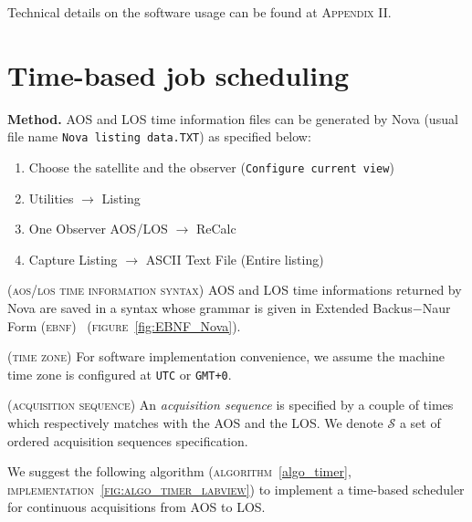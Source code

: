 \documentclass[a4paper]{report}
\newenvironment{definition}[1][Definition.]{\begin{trivlist}
\item[\hskip \labelsep {\bfseries #1}]}{\end{trivlist}}
\newenvironment{remark}[1][Remark.]{\begin{trivlist}
\item[\hskip \labelsep {\bfseries #1}]}{\end{trivlist}}
\begin{document}
\begin{remark}
  Technical details on the software usage can be found at \textsc{Appendix II}.
\end{remark}

\section {Time-based job scheduling}

\textbf{Method.}
AOS and LOS time information files can be generated by Nova (usual file name \texttt{Nova listing data.TXT}) as specified below:
\begin{enumerate}
\item {Choose the satellite and the observer (\texttt{Configure current view})}
\item {\textup{Utilities} $\rightarrow$ \textup{Listing}}
\item {\textup{One Observer AOS/LOS} $\rightarrow$ \textup{ReCalc}}
\item {\textup{Capture Listing} $\rightarrow$ \textup{ASCII Text File} (Entire listing)}
\end{enumerate}

\begin{remark}
  { \color{rltred}{\Radioactivity} }
  \textsc{(aos/los time information syntax)}
  AOS and LOS time informations returned by Nova are saved in a syntax whose grammar is given in Extended Backus$-$Naur Form (\textsc{ebnf})~\cite{EBNF} (\textsc{figure}~\ref{fig:EBNF_Nova}).
\end{remark}

\begin{remark}
  \textsc{(time zone)}
  For software implementation convenience, we assume the machine time zone is configured at \texttt{UTC} or \texttt{GMT+0}.
\end{remark}

\begin{definition}
  { \color{rltred}{\Radioactivity} }
  \textsc{(acquisition sequence)}
  An \textit{acquisition sequence} is specified by a couple of times which respectively matches with the AOS and the LOS. We denote $\mathcal{S}$ a set of ordered acquisition sequences specification.
\end{definition}

We suggest the following algorithm (\textsc{algorithm}~\ref{algo_timer}, \textsc{implementation~\ref{fig:algo_timer_labview}}) to implement a time-based scheduler for continuous acquisitions from AOS to LOS.
\end{document}
